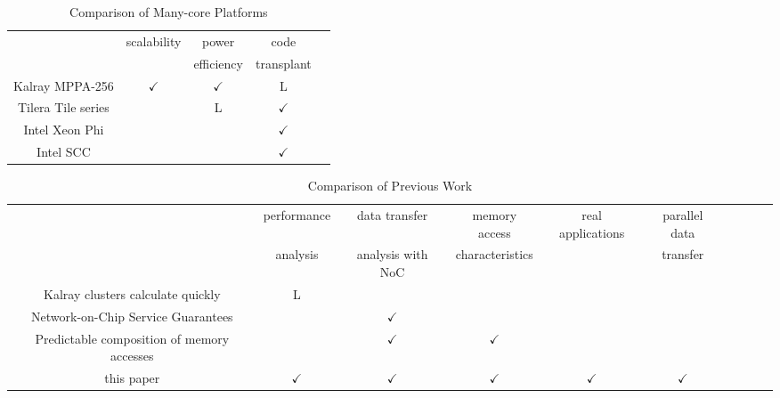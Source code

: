 \begin{landscape}
  \begin{table}[!htbp]
    \caption{\label{tb:comparison_manycore}
      Comparison of Many-core Platforms}
    \centering
    \begin{tabular}{c|cccc}
      \hline
      & \multirow{2}{*}{scalability} & power  & code & \\
      & & efficiency & transplant & \\
      \hline
      \hline
      Kalray MPPA-256 \cite{de2014time} & \(\checkmark\) & \(\checkmark\) & L & \\
      Tilera Tile series \cite{bell2008tile64} &  & L & \(\checkmark\) & \\
      Intel Xeon Phi \cite{chrysos2014intel} \cite{chrysos2012intel} &  &  & \(\checkmark\) & \\
      Intel SCC \cite{baron2010single} &  &  & \(\checkmark\) & \\
      \hline
    \end{tabular}
  \end{table}  
  \begin{table}[!htbp]
    \caption{\label{tb:comparison_relatedwork}
      Comparison of Previous Work}
    \centering
    \scriptsize	                    %
    \begin{tabular}{c|ccccccccc}
      \hline
      & performance & data transfer & memory access & \multirow{2}{*}{real applications} & parallel data & \\
      & analysis & analysis with NoC & characteristics & & transfer & \\
      \hline
      \hline
      Kalray clusters calculate quickly \cite{kanter2015kalray} & L &  &  &  &  & \\
      Network-on-Chip Service Guarantees \cite{denet2017work} &  & \(\checkmark\) &  &  &  & \\
      Predictable composition of memory accesses \cite{perret2016predictable} &  & \(\checkmark\) & \(\checkmark\) &  &  & \\
      this paper & \(\checkmark\) & \(\checkmark\) & \(\checkmark\) & \(\checkmark\) & \(\checkmark\) & \\
      \hline
    \end{tabular}
  \end{table}
\end{landscape}


